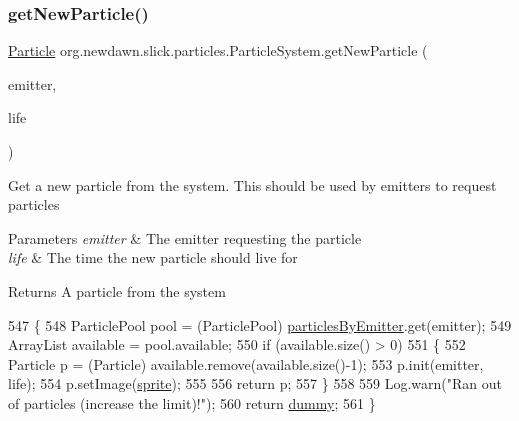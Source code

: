 \subsubsection{\texorpdfstring{get\+New\+Particle()}{getNewParticle()}}
{\footnotesize\ttfamily \mbox{\hyperlink{classorg_1_1newdawn_1_1slick_1_1particles_1_1_particle}{Particle}} org.\+newdawn.\+slick.\+particles.\+Particle\+System.\+get\+New\+Particle (\begin{DoxyParamCaption}\item[{\mbox{\hyperlink{interfaceorg_1_1newdawn_1_1slick_1_1particles_1_1_particle_emitter}{Particle\+Emitter}}}]{emitter,  }\item[{float}]{life }\end{DoxyParamCaption})\hspace{0.3cm}{\ttfamily [inline]}}

Get a new particle from the system. This should be used by emitters to request particles


\begin{DoxyParams}{Parameters}
{\em emitter} & The emitter requesting the particle \\
\hline
{\em life} & The time the new particle should live for \\
\hline
\end{DoxyParams}
\begin{DoxyReturn}{Returns}
A particle from the system 
\end{DoxyReturn}

\begin{DoxyCode}
547     \{
548         ParticlePool pool = (ParticlePool) \mbox{\hyperlink{classorg_1_1newdawn_1_1slick_1_1particles_1_1_particle_system_aec10bb63c0065ee17c8d8133936f5db6}{particlesByEmitter}}.get(emitter);
549         ArrayList available = pool.available;
550         \textcolor{keywordflow}{if} (available.size() > 0)
551         \{
552             Particle p = (Particle) available.remove(available.size()-1);
553             p.init(emitter, life);
554             p.setImage(\mbox{\hyperlink{classorg_1_1newdawn_1_1slick_1_1particles_1_1_particle_system_a42359ac9175deb095eaa520263e352da}{sprite}});
555             
556             \textcolor{keywordflow}{return} p;
557         \}
558         
559         Log.warn(\textcolor{stringliteral}{"Ran out of particles (increase the limit)!"});
560         \textcolor{keywordflow}{return} \mbox{\hyperlink{classorg_1_1newdawn_1_1slick_1_1particles_1_1_particle_system_aa0d598380df6fa8819ea082fef03f3aa}{dummy}};
561     \}
\end{DoxyCode}
\mbox{\label{classorg_1_1newdawn_1_1slick_1_1particles_1_1_particle_system_ad1e56b931fe0d2cea32cd23ff6d6a8fa}} 
